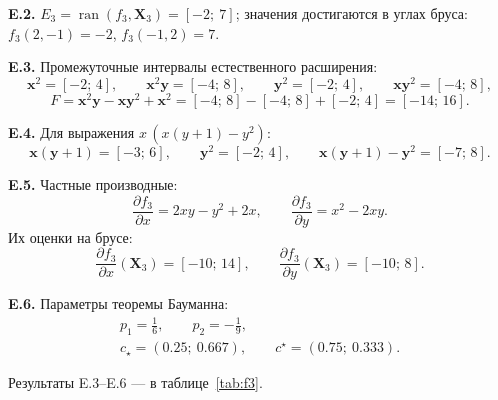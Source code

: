 \documentclass[a4paper, 14pt]{extarticle}
\begin{document}
\textbf{E.2.} $E_3 = \operatorname{ran}(f_3, \mathbf{X}_3) = [-2;\ 7]$; значения достигаются в углах бруса: $f_3(2,-1) = -2$, $f_3(-1,2) = 7$.

\textbf{E.3.} Промежуточные интервалы естественного расширения:
\begin{equation*}
    \mathbf{x}^2 = [-2;\,4],\qquad \mathbf{x}^2\mathbf{y} = [-4;\,8],\qquad \mathbf{y}^2 = [-2;\,4],\qquad \mathbf{x}\mathbf{y}^2 = [-4;\,8],
\end{equation*}
\begin{equation*}
    F = \mathbf{x}^2\mathbf{y} - \mathbf{x}\mathbf{y}^2 + \mathbf{x}^2 = [-4;\,8] - [-4;\,8] + [-2;\,4] = [-14;\,16].
\end{equation*}

\textbf{E.4.} Для выражения $x\,(x(y+1) - y^2)$:
\begin{equation*}
    \mathbf{x}(\mathbf{y}+1) = [-3;\,6],\qquad \mathbf{y}^2 = [-2;\,4],\qquad \mathbf{x}(\mathbf{y}+1) - \mathbf{y}^2 = [-7;\,8].
\end{equation*}

    
\textbf{E.5.} Частные производные:
\begin{equation*}
    \frac{\partial f_3}{\partial x} = 2xy - y^2 + 2x,\qquad \frac{\partial f_3}{\partial y} = x^2 - 2xy.
\end{equation*}
Их оценки на брусе:
\begin{equation*}
    \frac{\partial f_3}{\partial x}(\mathbf{X}_3) = [-10;\,14],\qquad \frac{\partial f_3}{\partial y}(\mathbf{X}_3) = [-10;\,8].
\end{equation*}

\textbf{E.6.} Параметры теоремы Бауманна:
\begin{gather*}
    p_1 = \frac16,\qquad p_2 = -\frac19,\\
    c_\star = (0.25;\ 0.667),\qquad c^\star = (0.75;\ 0.333).
\end{gather*}

Результаты E.3--E.6 --- в таблице~\ref{tab:f3}.
\end{document}
